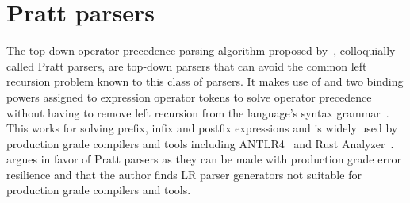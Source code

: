 \documentclass[
    oneside,
    english,
    coorientadorbanca,
    embeddedlogo,
    noabntexcite
]{ufsc-thesis-rn46-2019}
\begin{document}
\section{Pratt parsers}

The top-down operator precedence parsing algorithm proposed by~\textcite{pratt1973operatorprecedence}, colloquially called Pratt parsers, are top-down parsers that can avoid the common left recursion problem known to this class of parsers.
It makes use of and two binding powers assigned to expression operator tokens to solve operator precedence without having to remove left recursion from the language's syntax grammar~\cite{pratt1973operatorprecedence}.
This works for solving prefix, infix and postfix expressions and is widely used by production grade compilers and tools including ANTLR4~\cite{Parr13} and Rust Analyzer~\cite{matklad2020prattparsing}.
\textcite{matklad2020challenginglrparsing} argues in favor of Pratt parsers as they can be made with production grade error resilience and that the author finds LR parser generators not suitable for production grade compilers and tools.


\end{document}
